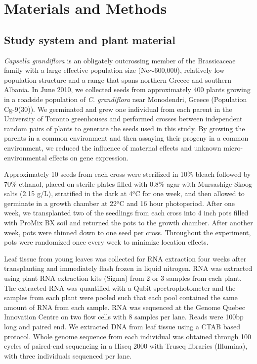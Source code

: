 \section{Materials and Methods}

\subsection{Study system and plant material}
\textit{Capsella grandiflora} is an obligately outcrossing member of the Brassicaceae family with a large effective population size (Ne$\sim$600,000), relatively low population structure and a range that spans northern Greece and southern Albania\citep{Slotte2010-gw,St_onge2011-jz}. In June 2010, we collected seeds from approximately 400 plants growing in a roadside population of \textit{C. grandiflora} near Monodendri, Greece (Population Cg-9(30)). We germinated and grew one individual from each parent in the University of Toronto greenhouses and performed crosses between independent random pairs of plants to generate the seeds used in this study. By growing the parents in a common environment and then assaying their progeny in a common environment, we reduced the influence of maternal effects and unknown micro-environmental effects on gene expression.

Approximately 10 seeds from each cross were sterilized in 10\% bleach followed by 70\% ethanol, placed on sterile plates filled with 0.8\% agar with Mursashige-Skoog salts (2.15 g/L), stratified in the dark at 4$^{o}$C for one week, and then allowed to germinate in a growth chamber at 22$^{o}$C and 16 hour photoperiod. After one week, we transplanted two of the seedlings from each cross into 4 inch pots filled with ProMix BX soil and returned the pots to the growth chamber. After another week, pots were thinned down to one seed per cross. Throughout the experiment, pots were randomized once every week to minimize location effects.

Leaf tissue from young leaves was collected for RNA extraction four weeks after transplanting and immediately flash frozen in liquid nitrogen. RNA was extracted using plant RNA extraction kits (Sigma) from 2 or 3 samples from each plant. The extracted RNA was quantified with a Qubit spectrophotometer and the samples from each plant were pooled such that each pool contained the same amount of RNA from each sample. RNA was sequenced at the Genome Quebec Innovation Centre on two flow cells with 8 samples per lane. Reads were 100bp long and paired end. We extracted DNA from leaf tissue using a CTAB based protocol. Whole genome sequence from each individual was obtained through 100 cycles of paired-end sequencing in a Hiseq 2000 with Truseq libraries (Illumina), with three individuals sequenced per lane.

